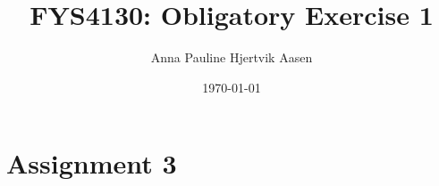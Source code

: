 \documentclass[onecolumn,english,notitlepage]{article}
\title{FYS4130: Obligatory Exercise 1}
\author{Anna Pauline Hjertvik Aasen}
\date{\today}
\begin{document}
\maketitle

\newpage

\section*{Assignment 3}

\end{document}

